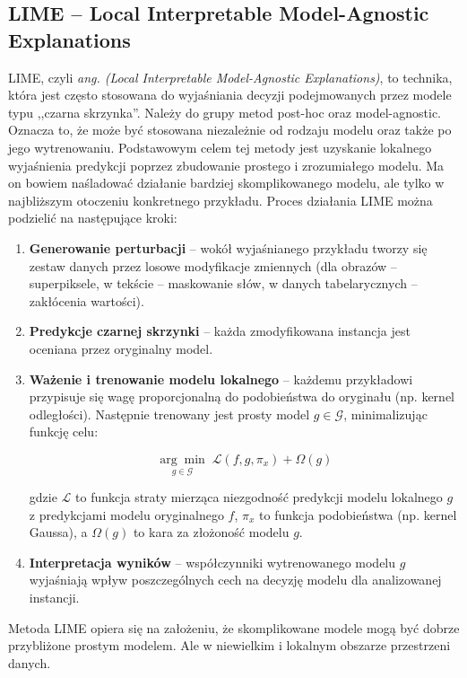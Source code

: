 \documentclass[wmii, inf, mgr]{uwmthesis}
\begin{document}
\subsection{LIME -- Local Interpretable Model-Agnostic Explanations}
LIME, czyli \textit{ang. (Local Interpretable Model-Agnostic Explanations)}, to technika, która jest często stosowana do wyjaśniania decyzji podejmowanych przez modele typu ,,czarna skrzynka''. Należy do grupy metod post-hoc oraz model-agnostic. Oznacza to, że może być stosowana niezależnie od rodzaju modelu oraz także po jego wytrenowaniu. Podstawowym celem tej metody jest uzyskanie lokalnego wyjaśnienia predykcji poprzez zbudowanie prostego i zrozumiałego modelu. Ma on bowiem naśladować działanie bardziej skomplikowanego modelu, ale tylko w~ najbliższym otoczeniu konkretnego przykładu. Proces działania LIME można podzielić na następujące kroki:

\begin{enumerate}
    \item \textbf{Generowanie perturbacji} -- wokół wyjaśnianego przykładu tworzy się zestaw danych przez losowe modyfikacje zmiennych (dla obrazów -- superpiksele, w tekście -- maskowanie słów, w danych tabelarycznych -- zakłócenia wartości).
    
    \item \textbf{Predykcje czarnej skrzynki} -- każda zmodyfikowana instancja jest oceniana przez oryginalny model.
    
    \item \textbf{Ważenie i trenowanie modelu lokalnego} -- każdemu przykładowi przypisuje się wagę proporcjonalną do podobieństwa do oryginału (np. kernel odległości). Następnie trenowany jest prosty model $g \in \mathcal{G}$, minimalizując funkcję celu:
    
    \[
    \underset{g \in \mathcal{G}}{\arg\min} \; \mathcal{L}(f, g, \pi_x) + \Omega(g)
    \]
    
    gdzie $\mathcal{L}$ to funkcja straty mierząca niezgodność predykcji modelu lokalnego $g$ z predykcjami modelu oryginalnego $f$, $\pi_x$ to funkcja podobieństwa (np. kernel Gaussa), a $\Omega(g)$ to kara za złożoność modelu $g$.
    
    \item \textbf{Interpretacja wyników} -- współczynniki wytrenowanego modelu $g$ wyjaśniają wpływ poszczególnych cech na decyzję modelu dla analizowanej instancji.
\end{enumerate}

Metoda LIME opiera się na założeniu, że skomplikowane modele mogą być dobrze przybliżone prostym modelem. Ale w niewielkim i lokalnym obszarze przestrzeni danych.
\end{document}
